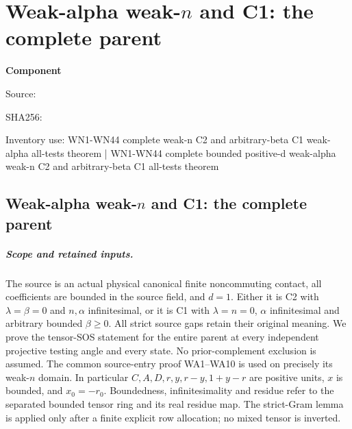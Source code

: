 \chapter{Weak-alpha weak-\(n\) and C1: the complete parent}
\label{component:p0db05df21ad1}
\noindent\textbf{Component }\par
{\small\noindent Source: \par}
{\small\noindent SHA256: \par}
{\small\noindent Inventory use: WN1-WN44 complete weak-n C2 and arbitrary-beta C1 weak-alpha all-tests theorem | WN1-WN44 complete bounded positive-d weak-alpha weak-n C2 and arbitrary-beta C1 all-tests theorem\par}
\medskip
\section{Weak-alpha weak-\(n\) and C1: the complete parent}
\label{p0db05df21ad1:sec:weak-alpha-weak-n-c1}

\paragraph{Scope and retained inputs.}
The source is an actual physical canonical finite noncommuting contact,
all coefficients are bounded in the source field, and \(d=1\).
Either it is C2 with \(\lambda=\beta=0\) and \(n,\alpha\) infinitesimal,
or it is C1 with \(\lambda=n=0\), \(\alpha\) infinitesimal and arbitrary
bounded \(\beta\geq0\). All strict source gaps retain their original
meaning. We prove the tensor-SOS statement for the entire parent at
every independent projective testing angle and every state.
No prior-complement exclusion is assumed.
The common source-entry proof WA1--WA10 is used on precisely its
weak-\(n\) domain. In particular \(C,A,D,r,y,r-y,1+y-r\) are positive
units, \(x\) is bounded, and \(x_0=-r_0\).
Boundedness, infinitesimality and residue refer
to the separated bounded tensor ring and its real residue map.
The strict-Gram lemma is applied only after a finite explicit row
allocation; no mixed tensor is inverted.

